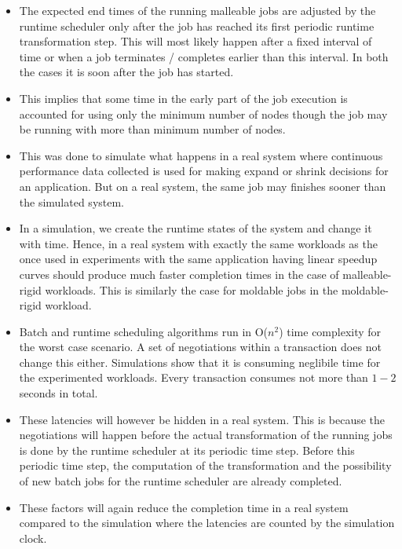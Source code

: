 \begin{itemize}
\item The expected end times of the running malleable jobs are adjusted by the runtime scheduler only after the job has reached its first periodic runtime transformation step. This will most likely happen after a fixed interval of time or when a job terminates / completes earlier than this interval. In both the cases it is soon after the job has started.
\item This implies that some time in the early part of the job execution is accounted for using only the minimum number of nodes though the job may be running with more than minimum number of nodes. 
\item This was done to simulate what happens in a real system where continuous performance data collected is used for making expand or shrink decisions for an application. But on a real system, the same job may finishes sooner than the simulated system.
\item In a simulation, we create the runtime states of the system and change it with time. Hence, in a real system with exactly the same workloads as the once used in experiments with the same application having linear speedup curves should produce much faster completion times in the case of malleable-rigid workloads. This is similarly the case for moldable jobs in the moldable-rigid workload.
\item Batch and runtime scheduling algorithms run in O($n^{2}$) time complexity for the worst case scenario. A set of negotiations within a transaction does not change this either. Simulations show that it is consuming neglibile time for the experimented workloads. Every transaction consumes not more than $1-2$ seconds in total.
\item These latencies will however be hidden in a real system. This is because the negotiations will happen before the actual transformation of the running jobs is done by the runtime scheduler at its periodic time step. Before this periodic time step, the computation of the transformation and the possibility of new batch jobs for the runtime scheduler are already completed.
\item These factors will again reduce the completion time in a real system compared to the simulation where the latencies are counted by the simulation clock.
\end{itemize}

